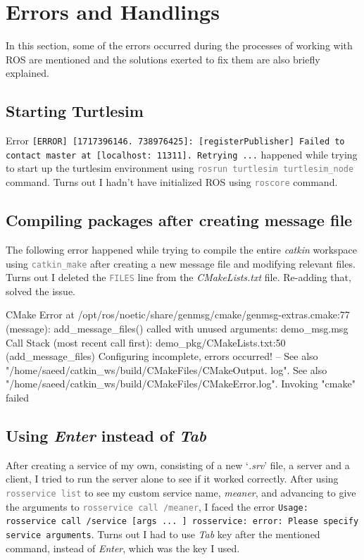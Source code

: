 \documentclass[conference]{IEEEtran}
\newcommand{\error}[1]{\textcolor{red!75!black}{\footnotesize \texttt{#1}}}
\newcommand{\command}[1]{\textcolor{gray}{\footnotesize \texttt{#1}}}
\begin{document}
\section{Errors and Handlings}
In this section, some of the errors occurred during the processes of working with ROS are mentioned and the solutions exerted to fix them are also briefly explained.

\subsection{Starting Turtlesim}
\label{sec:Starting_Turtlesim}
Error \error{[ERROR] [1717396146. 738976425]: [registerPublisher] Failed to contact master at [localhost: 11311]. Retrying ...} happened while trying to start up the turtlesim environment using \command{rosrun turtlesim turtlesim\_node} command. Turns out I hadn't have initialized ROS using \command{roscore} command.
\vspace{10px}

\subsection{Compiling packages after creating message file}
\label{sec:Compiling_packages}
The following error happened while trying to compile the entire \textit{catkin} workspace using \command{catkin\_make} after creating a new message file and modifying relevant files. Turns out I deleted the \command{FILES} line from the \textit{CMakeLists.txt} file. Re-adding that, solved the issue.
\begin{terminalerror}
    CMake Error at /opt/ros/noetic/share/genmsg/cmake/genmsg-extras.cmake:77 (message):
    add_message_files() called with unused arguments: demo_msg.msg
    Call Stack (most recent call first):
    demo_pkg/CMakeLists.txt:50 (add_message_files)
    Configuring incomplete, errors occurred!
    --
    See also "/home/saeed/catkin_ws/build/CMakeFiles/CMakeOutput. log".
    See also "/home/saeed/catkin_ws/build/CMakeFiles/CMakeError.log".
    Invoking "cmake" failed
\end{terminalerror}
\vspace{10px}

\subsection{Using \textit{Enter} instead of \textit{Tab}}
\label{sec:Using_Enter}
After creating a service of my own, consisting of a new `\textit{.srv}' file, a server and a client, I tried to run the server alone to see if it worked correctly. After using \command{rosservice list} to see my custom service name, \textit{meaner}, and advancing to give the arguments to \command{rosservice call /meaner}, I faced the error \error{Usage: rosservice call /service [args ... ]
rosservice: error: Please specify service arguments}. Turns out I had to use \textit{Tab} key after the mentioned command, instead of \textit{Enter}, which was the key I used.
\vspace{10px}
\end{document}
